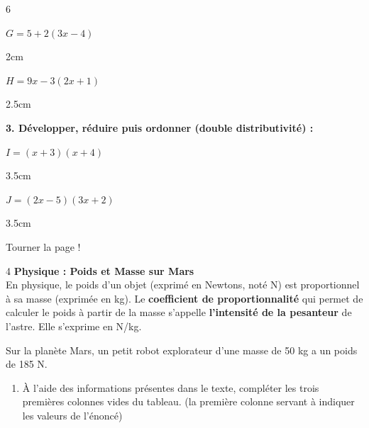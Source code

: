 \documentclass[a4paper]{book}
\begin{document}
{\begin{exerciceNote}{6}
        \medskip
        
        \noindent
        \begin{minipage}{0.48\textwidth}
            $G = 5 + 2(3x - 4)$
            \begin{ZoneReponse}{2cm}
            \end{ZoneReponse}
        \end{minipage}\hfill
        \begin{minipage}{0.48\textwidth}
            $H = 9x - 3(2x + 1)$
            \begin{ZoneReponse}{2.5cm}
            \end{ZoneReponse}
        \end{minipage}
    
        \medskip
        \textbf{3. Développer, réduire puis ordonner (double distributivité) :}
        
        \noindent
        \begin{minipage}{0.48\textwidth}
            $I = (x + 3)(x + 4)$
            \begin{ZoneReponse}{3.5cm}
            \end{ZoneReponse}
        \end{minipage}\hfill
        \begin{minipage}{0.48\textwidth}
            $J = (2x - 5)(3x + 2)$
            \begin{ZoneReponse}{3.5cm}
            \end{ZoneReponse}
        \end{minipage}
    \end{exerciceNote}

    \vfill  \hfill Tourner la page !
    
\newpage
    
    \begin{exerciceNote}{4}
        \textbf{Physique : Poids et Masse sur Mars} \\
        En physique, le poids d'un objet (exprimé en Newtons, noté N) est proportionnel à sa masse (exprimée en kg). Le \textbf{coefficient de proportionnalité} qui permet de calculer le poids à partir de la masse s'appelle \textbf{l'intensité de la pesanteur} de l'astre. Elle s'exprime en N/kg.
        
        \smallskip
        Sur la planète Mars, un petit robot explorateur d'une masse de 50 kg a un poids de 185 N.
            
        \begin{enumerate}
            \item À l'aide des informations présentes dans le texte, compléter les trois premières colonnes vides du tableau. (la première colonne servant à indiquer les valeurs de l'énoncé)


\end{enumerate}
\end{exerciceNote}}
\end{document}
